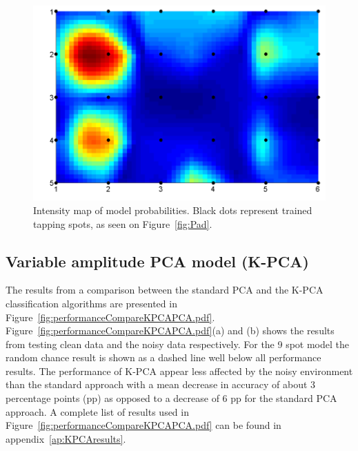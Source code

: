\begin{figure}[!]
\centering
\includegraphics[width=150mm]{padPlot.pdf}
\caption{Intensity map of model probabilities. Black dots represent trained tapping spots, as seen on Figure~\ref{fig:Pad}. }\label{fig:padPlot}
\end{figure}

\subsection{Variable amplitude PCA model (K-PCA)}

The results from a comparison between the standard PCA and the K-PCA classification algorithms are presented in Figure~\ref{fig:performanceCompareKPCAPCA.pdf}. Figure~\ref{fig:performanceCompareKPCAPCA.pdf}(a) and (b) shows the results from testing clean data and the noisy data respectively. For the 9 spot model the random chance result is shown as a dashed line well below all performance results. The performance of K-PCA appear less affected by the noisy environment than the standard approach with a mean decrease in accuracy of about 3 percentage points (pp) as opposed to a decrease of 6 pp for the standard PCA approach. A complete list of results used in Figure~\ref{fig:performanceCompareKPCAPCA.pdf} can be found in appendix~\ref{ap:KPCAresults}.

